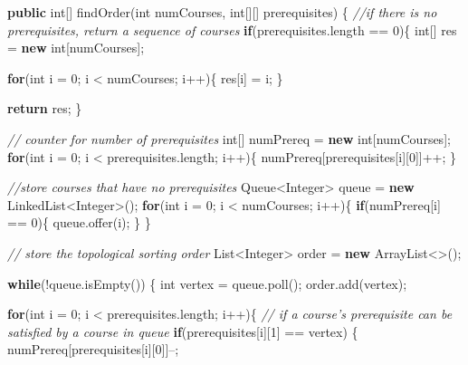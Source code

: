 \documentclass[]{book}
\newenvironment{Shaded}{\begin{snugshade}}{\end{snugshade}}
\newcommand{\BuiltInTok}[1]{#1}
\newcommand{\CommentTok}[1]{\textcolor[rgb]{0.56,0.35,0.01}{\textit{#1}}}
\newcommand{\DataTypeTok}[1]{\textcolor[rgb]{0.13,0.29,0.53}{#1}}
\newcommand{\DecValTok}[1]{\textcolor[rgb]{0.00,0.00,0.81}{#1}}
\newcommand{\FunctionTok}[1]{\textcolor[rgb]{0.00,0.00,0.00}{#1}}
\newcommand{\KeywordTok}[1]{\textcolor[rgb]{0.13,0.29,0.53}{\textbf{#1}}}
\newcommand{\NormalTok}[1]{#1}
\begin{document}
\begin{Shaded}
\begin{Highlighting}[]
\KeywordTok{public} \DataTypeTok{int}\NormalTok{[] }\FunctionTok{findOrder}\NormalTok{(}\DataTypeTok{int}\NormalTok{ numCourses, }\DataTypeTok{int}\NormalTok{[][] prerequisites) \{}
    \CommentTok{//if there is no prerequisites, return a sequence of courses}
    \KeywordTok{if}\NormalTok{(prerequisites.}\FunctionTok{length}\NormalTok{ == }\DecValTok{0}\NormalTok{)\{}
        \DataTypeTok{int}\NormalTok{[] res = }\KeywordTok{new} \DataTypeTok{int}\NormalTok{[numCourses];}

        \KeywordTok{for}\NormalTok{(}\DataTypeTok{int}\NormalTok{ i = }\DecValTok{0}\NormalTok{; i < numCourses; i++)\{}
\NormalTok{            res[i] = i;}
\NormalTok{        \}}

        \KeywordTok{return}\NormalTok{ res;}
\NormalTok{    \}}

    \CommentTok{// counter for number of prerequisites}
    \DataTypeTok{int}\NormalTok{[] numPrereq = }\KeywordTok{new} \DataTypeTok{int}\NormalTok{[numCourses];}
    \KeywordTok{for}\NormalTok{(}\DataTypeTok{int}\NormalTok{ i = }\DecValTok{0}\NormalTok{; i < prerequisites.}\FunctionTok{length}\NormalTok{; i++)\{}
\NormalTok{        numPrereq[prerequisites[i][}\DecValTok{0}\NormalTok{]]++;}
\NormalTok{    \}}

    \CommentTok{//store courses that have no prerequisites}
    \BuiltInTok{Queue}\NormalTok{<}\BuiltInTok{Integer}\NormalTok{> queue = }\KeywordTok{new} \BuiltInTok{LinkedList}\NormalTok{<}\BuiltInTok{Integer}\NormalTok{>();}
    \KeywordTok{for}\NormalTok{(}\DataTypeTok{int}\NormalTok{ i = }\DecValTok{0}\NormalTok{; i < numCourses; i++)\{}
        \KeywordTok{if}\NormalTok{(numPrereq[i] == }\DecValTok{0}\NormalTok{)\{}
\NormalTok{            queue.}\FunctionTok{offer}\NormalTok{(i);}
\NormalTok{        \}}
\NormalTok{    \}}

    \CommentTok{// store the topological sorting order}
    \BuiltInTok{List}\NormalTok{<}\BuiltInTok{Integer}\NormalTok{> order = }\KeywordTok{new} \BuiltInTok{ArrayList}\NormalTok{<>();}

    \KeywordTok{while}\NormalTok{(!queue.}\FunctionTok{isEmpty}\NormalTok{()) \{}
        \DataTypeTok{int}\NormalTok{ vertex = queue.}\FunctionTok{poll}\NormalTok{();}
\NormalTok{        order.}\FunctionTok{add}\NormalTok{(vertex);}

        \KeywordTok{for}\NormalTok{(}\DataTypeTok{int}\NormalTok{ i = }\DecValTok{0}\NormalTok{; i < prerequisites.}\FunctionTok{length}\NormalTok{; i++)\{}
            \CommentTok{// if a course's prerequisite can be satisfied by a course in queue}
            \KeywordTok{if}\NormalTok{(prerequisites[i][}\DecValTok{1}\NormalTok{] == vertex) \{}
\NormalTok{                numPrereq[prerequisites[i][}\DecValTok{0}\NormalTok{]]--;}


\end{Highlighting}
\end{Shaded}
\end{document}
